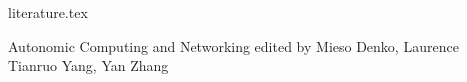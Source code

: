 literature.tex

Autonomic Computing and Networking
edited by Mieso Denko, Laurence Tianruo Yang, Yan Zhang

